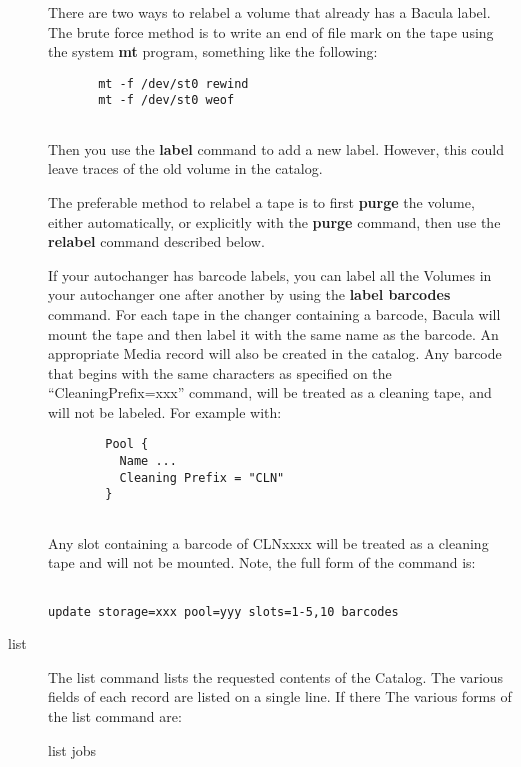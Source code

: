 \begin{description}
There are two ways to relabel a volume that already has  a Bacula label. The
brute  force method is to write an end of file mark on the tape  using the
system {\bf mt} program, something like the  following:  

\footnotesize
\begin{verbatim}
       mt -f /dev/st0 rewind
       mt -f /dev/st0 weof
       
\end{verbatim}
\normalsize

Then you use the {\bf label} command to add a new label.  However, this could
leave traces of the old volume in the  catalog.  

The preferable method to relabel a tape is to first {\bf purge}  the volume,
either automatically, or explicitly with the  {\bf purge} command, then use
the {\bf relabel} command described  below.  

If your autochanger has barcode labels, you can label all the  Volumes in your
autochanger one after another by using the  {\bf label barcodes} command. For
each tape in the changer containing  a barcode, Bacula will mount the tape and
then label it with the  same name as the barcode. An appropriate Media record
will also be  created in the catalog. Any barcode that begins with the same
characters  as specified on the ``CleaningPrefix=xxx'' command, will be
treated as a  cleaning tape, and will not be labeled. For example with:  

\footnotesize
\begin{verbatim}
        Pool {
          Name ...
          Cleaning Prefix = "CLN"
        }
        
\end{verbatim}
\normalsize

Any slot containing a barcode of CLNxxxx will be treated as a cleaning  tape
and will not be mounted. Note, the full form of the command is: 

\footnotesize
\begin{verbatim}
     
update storage=xxx pool=yyy slots=1-5,10 barcodes
\end{verbatim}
\normalsize

\item [list]
   The list command lists the requested contents of the  Catalog. The various
fields of each record are listed on a single  line. If there The various forms
of the list command are:

list jobs


\end{description}
